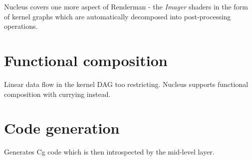 Nucleus covers one more aspect of Renderman - the \emph{Imager} shaders in the form of kernel graphs which are automatically decomposed into post-processing operations.

\section{Functional composition}

Linear data flow in the kernel DAG too restricting. Nucleus supports functional composition with currying instead.

\section{Code generation}

Generates Cg code which is then introspected by the mid-level layer.
